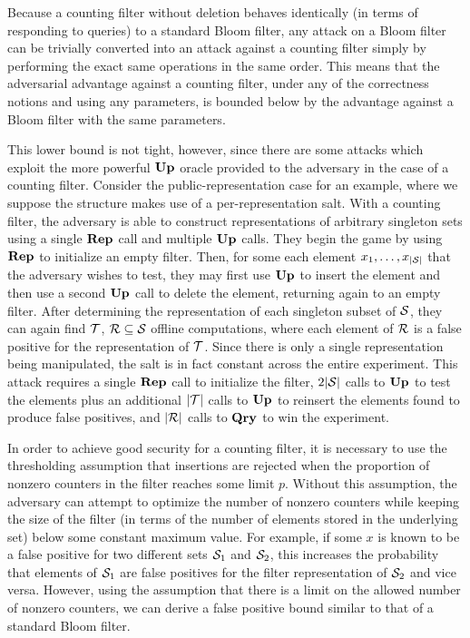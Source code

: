 Because a counting filter without deletion behaves identically (in terms of responding to queries) to a standard Bloom filter, any attack on a Bloom filter can be trivially converted into an attack against a counting filter simply by performing the exact same operations in the same order. This means that the adversarial advantage against a counting filter, under any of the correctness notions and using any parameters, is bounded below by the advantage against a Bloom filter with the same parameters.

This lower bound is not tight, however, since there are some attacks which exploit the more powerful $\mathbf{Up}\hspace{0.5pt}$ oracle provided to the adversary in the case of a counting filter. Consider the public-representation case for an example, where we suppose the structure makes use of a per-representation salt. With a counting filter, the adversary is able to construct representations of arbitrary singleton sets using a single $\mathbf{Rep}\hspace{0.5pt}$ call and multiple $\mathbf{Up}\hspace{0.5pt}$ calls. They begin the game by using $\mathbf{Rep}\hspace{0.5pt}$ to initialize an empty filter. Then, for some each element $x_1, \ldots, x_{|\mathcal{S}|}$ that the adversary wishes to test, they may first use $\mathbf{Up}\hspace{0.5pt}$ to insert the element and then use a second $\mathbf{Up}\hspace{0.5pt}$ call to delete the element, returning again to an empty filter. After determining the representation of each singleton subset of $\mathcal{S}$, they can again find $\mathcal{T}$, $\mathcal{R} \subseteq \mathcal{S}$ offline computations, where each element of $\mathcal{R}$ is a false positive for the representation of $\mathcal{T}$. Since there is only a single representation being manipulated, the salt is in fact constant across the entire experiment. This attack requires a single $\mathbf{Rep}\hspace{0.5pt}$ call to initialize the filter, $2|\mathcal{S}|$ calls to $\mathbf{Up}\hspace{0.5pt}$ to test the elements plus an additional $|\mathcal{T}|$ calls to $\mathbf{Up}\hspace{0.5pt}$ to reinsert the elements found to produce false positives, and $|\mathcal{R}|$ calls to $\mathbf{Qry}\hspace{0.5pt}$ to win the experiment.

In order to achieve good security for a counting filter, it is necessary to use the thresholding assumption that insertions are rejected when the proportion of nonzero counters in the filter reaches some limit $p$. Without this assumption, the adversary can attempt to optimize the number of nonzero counters while keeping the size of the filter (in terms of the number of elements stored in the underlying set) below some constant maximum value. For example, if some $x$ is known to be a false positive for two different sets $\mathcal{S}_1$ and $\mathcal{S}_2$, this increases the probability that elements of $\mathcal{S}_1$ are false positives for the filter representation of $\mathcal{S}_2$ and vice versa. However, using the assumption that there is a limit on the allowed number of nonzero counters, we can derive a false positive bound similar to that of a standard Bloom filter.

